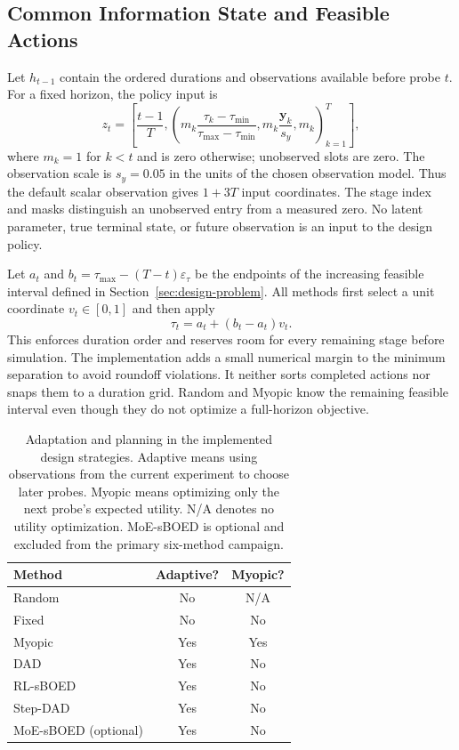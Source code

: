 \documentclass[journal]{IEEEtran}
\begin{document}
\subsection{Common Information State and Feasible Actions}
Let $h_{t-1}$ contain the ordered durations and observations available before
probe $t$. For a fixed horizon, the policy input is
\begin{equation}
z_t=\left[\frac{t-1}{T},
 \left(m_k\frac{\tau_k-\tau_{\min}}{\tau_{\max}-\tau_{\min}},
 m_k\frac{\mathbf y_k}{s_y},m_k\right)_{k=1}^{T}\right],
\label{eq:history-features}
\end{equation}
where $m_k=1$ for $k<t$ and is zero otherwise; unobserved slots are zero.
The observation scale is $s_y=0.05$ in the units of the chosen observation
model. Thus the default scalar observation gives $1+3T$ input coordinates.
The stage index and masks distinguish an unobserved entry from a measured
zero. No latent parameter, true terminal state, or future observation is an
input to the design policy.

Let $a_t$ and $b_t=\tau_{\max}-(T-t)\varepsilon_\tau$ be the endpoints of
the increasing feasible interval defined in Section~\ref{sec:design-problem}.
All methods first select a unit coordinate $v_t\in[0,1]$ and then apply
\begin{equation}
\tau_t=a_t+(b_t-a_t)v_t.
\label{eq:common-action-map}
\end{equation}
This enforces duration order and reserves room for every remaining stage
before simulation. The implementation adds a small numerical margin to the
minimum separation to avoid roundoff violations. It neither sorts completed
actions nor snaps them to a duration grid. Random and Myopic know the remaining
feasible interval even though they do not optimize a full-horizon objective.

\begin{table}[t]
\caption{Adaptation and planning in the implemented design strategies.
Adaptive means using observations from the current experiment to choose
later probes. Myopic means optimizing only the next probe's expected utility.
N/A denotes no utility optimization. MoE-sBOED is optional and excluded from the primary six-method campaign.}
\centering
\begin{tabular}{lcc}
\toprule
Method & Adaptive? & Myopic?\\
\midrule
Random & No & N/A\\
Fixed & No & No\\
Myopic & Yes & Yes\\
DAD & Yes & No\\
RL-sBOED & Yes & No\\
Step-DAD & Yes & No\\
MoE-sBOED (optional) & Yes & No\\
\bottomrule
\end{tabular}
\label{tab:method-capabilities}
\end{table}
\end{document}
